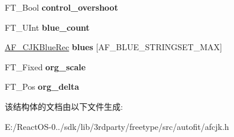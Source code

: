 \begin{DoxyCompactItemize}
F\+T\+\_\+\+Bool {\bfseries control\+\_\+overshoot}
\item 
\mbox{\label{struct_a_f___c_j_k_axis_rec___a197455ca873dda96b5458944ec232cab}} 
F\+T\+\_\+\+U\+Int {\bfseries blue\+\_\+count}
\item 
\mbox{\label{struct_a_f___c_j_k_axis_rec___af4106b74579d0449fbc9ccbdc1ac4be4}} 
\hyperlink{struct_a_f___c_j_k_blue_rec__}{A\+F\+\_\+\+C\+J\+K\+Blue\+Rec} {\bfseries blues} \mbox{[}A\+F\+\_\+\+B\+L\+U\+E\+\_\+\+S\+T\+R\+I\+N\+G\+S\+E\+T\+\_\+\+M\+AX\mbox{]}
\item 
\mbox{\label{struct_a_f___c_j_k_axis_rec___a78be1dfe71e60ed4af49ac8b8a6f6427}} 
F\+T\+\_\+\+Fixed {\bfseries org\+\_\+scale}
\item 
\mbox{\label{struct_a_f___c_j_k_axis_rec___a300faa708afee1028870dcc28256c864}} 
F\+T\+\_\+\+Pos {\bfseries org\+\_\+delta}
\end{DoxyCompactItemize}


该结构体的文档由以下文件生成\+:\begin{DoxyCompactItemize}
\item 
E\+:/\+React\+O\+S-\/0../sdk/lib/3rdparty/freetype/src/autofit/afcjk.\+h\end{DoxyCompactItemize}
